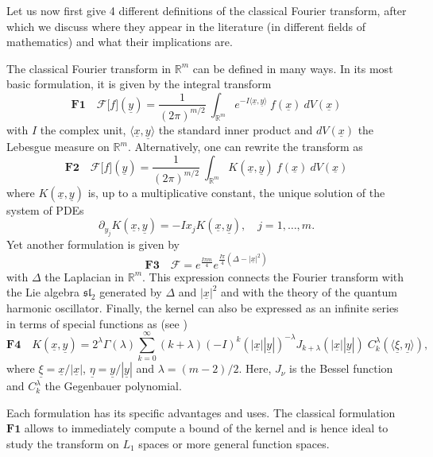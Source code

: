 \documentclass{amsart}
\theoremstyle{remark}
\begin{document}
Let us now first give 4 different definitions of the classical Fourier transform, after which we discuss where they appear in the literature (in different fields of mathematics) and what their implications are.

The classical Fourier transform in ${\mathbb{R}}^{m}$ can be defined in many ways. In its most basic formulation, it is given by the integral transform
\[
\textbf{F1}\quad  {\mathcal{F}} \lbrack f \rbrack ({\underline{y}}) = \frac{1}{(2 \pi)^{m/2}} \ \int_{\mathbb{R}^m} e^{-I {{\langle}} {\underline{x}},{\underline{y}} {{\rangle}}} \ f({\underline{x}}) \ dV({\underline{x}})
\]
with $I$ the complex unit, ${{\langle}} {\underline{x}},{\underline{y}} {{\rangle}}$ the standard inner product and $dV({\underline{x}})$ the Lebesgue measure on $\mathbb{R}^m$.
Alternatively, one can rewrite the transform as
\[
\textbf{F2}\quad {\mathcal{F}} \lbrack f \rbrack ({\underline{y}}) = \frac{1}{(2 \pi)^{m/2}} \ \int_{\mathbb{R}^m} K({\underline{x}},{\underline{y}}) \ f({\underline{x}}) \ dV({\underline{x}})
\]
where $K({\underline{x}},{\underline{y}})$ is, up to a multiplicative constant, the unique solution of the system of PDEs
\[
\partial_{y_{j}} K({\underline{x}},{\underline{y}}) = - I x_{j} K({\underline{x}},{\underline{y}}), \quad j =1, \ldots, m.
\]
Yet another formulation is given by
\[
\textbf{F3}\quad {\mathcal{F}} = e^{ \frac{I \pi m}{4}} e^{\frac{I \pi}{4}(\Delta - |{\underline{x}}|^{2})}
\]
with $\Delta$ the Laplacian in ${\mathbb{R}}^{m}$. This expression connects the Fourier transform with the Lie algebra $\mathfrak{sl}_{2}$ generated by $\Delta$ and $|{\underline{x}}|^{2}$ and with the theory of the quantum harmonic oscillator.
Finally, the kernel can also be expressed as an infinite series in terms of special functions as (see \cite[Section 11.5]{MR0010746})
\[
\textbf{F4}\quad K({\underline{x}}, {\underline{y}}) = 2^{\lambda} \Gamma(\lambda)\sum_{k=0}^{\infty}(k+ \lambda) (-I)^{k} (|{\underline{x}}||{\underline{y}}|)^{-\lambda} J_{k+ \lambda}(|{\underline{x}}||{\underline{y}}|) \; C_{k}^{\lambda}(\langle \underline{\xi},\underline{\eta} \rangle),
\]
where $\underline{\xi}= {\underline{x}}/|{\underline{x}}|$, $\underline{\eta} = {\underline{y}}/|{\underline{y}}|$ and $\lambda =(m-2)/2$. Here, $J_{\nu}$ is the Bessel function and $C_{k}^{{\lambda}}$ the Gegenbauer polynomial.

Each formulation has its specific advantages and uses. The classical formulation $\textbf{F1}$ allows to immediately compute a bound of the kernel and is hence ideal to study the transform on $L_{1}$ spaces or more general function spaces. 
\end{document}
